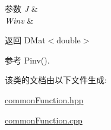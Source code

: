 \begin{DoxyParams}{参数}
{\em J} & \\
\hline
{\em Winv} & \\
\hline
\end{DoxyParams}
\begin{DoxyReturn}{返回}
D\+Mat$<$double$>$ 
\end{DoxyReturn}


参考 Pinv().



该类的文档由以下文件生成\+:\begin{DoxyCompactItemize}
\item 
\hyperlink{commonFunction_8hpp}{common\+Function.\+hpp}\item 
\hyperlink{commonFunction_8cpp}{common\+Function.\+cpp}\end{DoxyCompactItemize}
